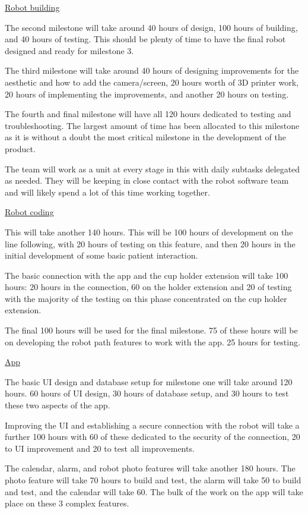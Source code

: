 \documentclass{article}
\begin{document}
\underline{Robot building} 



The second milestone will take around 40 hours of design, 100 hours of building, and 40 hours of testing. This should be plenty of time to have the final robot designed and ready for milestone 3.

The third milestone will take around 40 hours of designing improvements for the aesthetic and how to add the camera/screen, 20 hours worth of 3D printer work, 20 hours of implementing the improvements, and another 20 hours on testing.

The fourth and final milestone will have all 120 hours dedicated to testing and troubleshooting. The largest amount of time has been allocated to this milestone as it is without a doubt the most critical milestone in the development of the product.

The team will work as a unit at every stage in this with daily subtasks delegated as needed. They will be keeping in close contact with the robot software team and will likely spend a lot of this time working together.

\underline{Robot coding}



This will take another 140 hours. This will be 100 hours of development on the line following, with 20 hours of testing on this feature, and then 20 hours in the initial development of some basic patient interaction.

The basic connection with the app and the cup holder extension will take 100 hours: 20 hours in the connection, 60 on the holder extension and 20 of testing with the majority of the testing on this phase concentrated on the cup holder extension.

The final 100 hours will be used for the final milestone. 75 of these hours will be on developing the robot path features to work with the app. 25 hours for testing.

\underline{App}

The basic UI design and database setup for milestone one will take around 120 hours. 60 hours of UI design, 30 hours of database setup, and 30 hours to test these two aspects of the app.

Improving the UI and establishing a secure connection with the robot will take a further 100 hours with 60 of these dedicated to the security of the connection, 20 to UI improvement and 20 to test all improvements.

The calendar, alarm, and robot photo features will take another 180 hours. The photo feature will take 70 hours to build and test, the alarm will take 50 to build and test, and the calendar will take 60. The bulk of the work on the app will take place on these 3 complex features.
\end{document}

